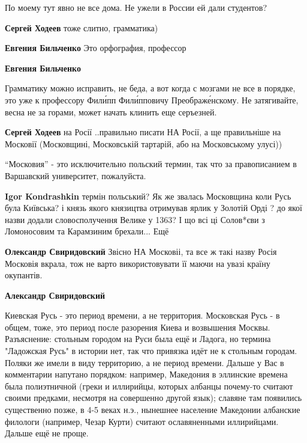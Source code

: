 \begin{itemize}
По моему тут явно не все дома. Не ужели в России ей дали студентов?

\begin{itemize} %
\textbf{Сергей Ходеев} тоже слитно, грамматика)

\textbf{Евгения Бильченко} Это орфография, профессор

\textbf{Евгения Бильченко} 

Грамматику можно исправить, не беда, а вот когда с мозгами не все в порядке,
это уже к профессору Фили́пп Фили́пповичу Преображе́нскому. Не затягивайте, весна
не за горами, может начать клинить еще серъезней.


\textbf{Сергей Ходеев} на Росії ..правильно писати НА Росії, а ще правильніше на Московії (Московщині, Московській тартарій, або на Московському улусі))

\enquote{Московия} - это исключительно польский термин, так что за правописанием в Варшавский университет, пожалуйста.

\textbf{Igor Kondrashkin} термін польський? Як же звалась Московщина коли Русь була Київська? і князь якого князицтва отримував ярлик у Золотій Орді ? до якої назви додали словосполучення Велике у 1363? І що всі ці Солов*єви з Ломоносовим та Карамзиним брехали... Ещё

\textbf{Олександр Свиридовский} Звісно НА Московіі, та все ж такі назву Росія Московія вкрала, тож не варто використовувати її маючи на увазі країну окупантів.

\textbf{Александр Свиридовский} 

Киевская Русь - это период времени, а не территория. Московская Русь - в
общем, тоже, это период после разорения Киева и возвышения Москвы. Разъяснение:
стольным городом на Руси была ещё и Ладога, но термина "Ладожская Русь" в
истории нет, так что привязка идёт не к стольным городам. Поляки же имели в
виду территорию, а не период времени. Дальше у Вас в комментарии напутано
порядком: например, Македония в эллинские времена была полиэтничной (греки и
иллирийцы, которых албанцы почему-то считают своими предками, несмотря на
совершенно другой язык); славяне там появились существенно позже, в 4-5 веках
н.э., нынешнее население Македонии албанские филологи (например, Чезар Курти)
считают ославяненными иллирийцами. Дальше ещё не проще.



\end{itemize}
\end{itemize}
